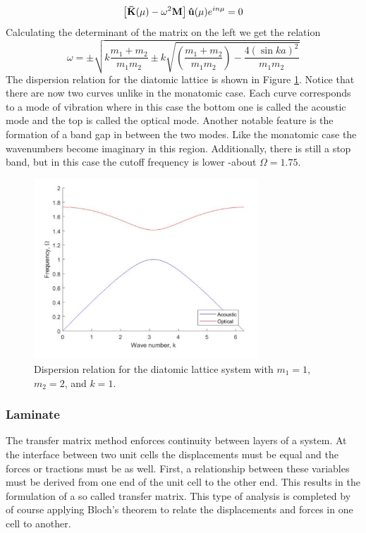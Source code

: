 \documentclass{article}
\begin{document}
\begin{equation}
\left[\mathbf{\Bar{K}}(\mu) -\omega^2 \mathbf{M} \right] 
\mathbf{\hat{u}}(\mu)e^{in\mu} = 0
\end{equation}
Calculating the determinant of the matrix on the left we get the relation
\begin{equation}
\omega =\pm \sqrt{k\frac{m_1+m_2}{m_1m_2} \pm k 
\sqrt{\left(\frac{m_1+m_2}{m_1m_2}\right) - \frac{4(\sin{ka})^2}{m_1m_2}}}
\end{equation}
The dispersion relation for the diatomic lattice is shown in Figure 
\ref{fig:dia-exact}. Notice that there are now two curves unlike in the 
monatomic case. Each curve corresponds to a mode of vibration where in this 
case the bottom one is called the acoustic mode and the top is called the 
optical mode. Another notable feature is the formation of a band gap in between 
the two modes. Like the monatomic case the wavenumbers become imaginary in this 
region. Additionally, there is still a stop band, but in this case the cutoff 
frequency is lower -about $\Omega = 1.75$.
\begin{figure}[!htbp]
	\centering
	\includegraphics[width=0.75\textwidth]{diatomic-exact.pdf}
	\caption{Dispersion relation for the diatomic lattice system with 
	$m_1=1$, $m_2=2$, and $k=1$.}
	\label{fig:dia-exact}
\end{figure}

\subsubsection{Laminate}
The transfer matrix method enforces continuity between layers of a system. At 
the interface between two unit cells the displacements must be equal and the 
forces or tractions must be as well. First, a relationship between these 
variables must be derived from one end of the unit cell to the other end. This 
results in the formulation of a so called transfer matrix. This type of 
analysis is completed by of course applying Bloch's theorem to relate the 
displacements and forces in one cell to another.
\end{document}
